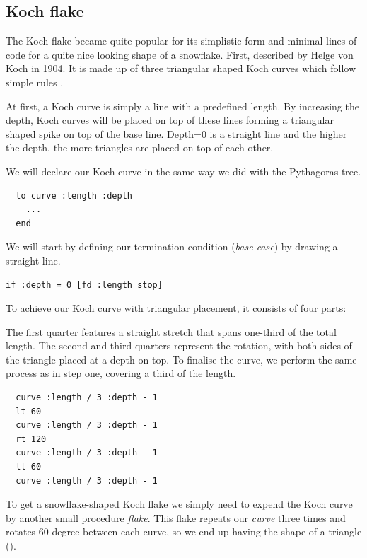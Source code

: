 \documentclass[a4paper, 11pt]{article}
\begin{document}
\subsection{Koch flake}

The Koch flake became quite popular for its simplistic form and minimal lines of code for a quite nice looking shape of a snowflake.
First, described by Helge von Koch in 1904. It is made up of three triangular shaped Koch curves which follow simple rules \cite{mathworld2}.

At first, a Koch curve is simply a line with a predefined length. By increasing the depth, Koch curves will be placed on top of these lines forming a triangular shaped spike on top of the base line.
Depth=0 is a straight line and the higher the depth, the more triangles are placed on top of each other.

We will declare our Koch curve in the same way we did with the Pythagoras tree.

\begin{lstlisting}
  to curve :length :depth
    ...
  end
\end{lstlisting}

We will start by defining our termination condition (\textit{base case}) by drawing a straight line.

\begin{lstlisting}[title=Part 1/4:]
  if :depth = 0 [fd :length stop]
\end{lstlisting}

To achieve our Koch curve with triangular placement, it consists of four parts:

The first quarter features a straight stretch that spans one-third of the total length. The second and third quarters represent the rotation, with both sides of the triangle placed at a depth on top. To finalise the curve, we perform the same process as in step one, covering a third of the length.

\begin{lstlisting}
  curve :length / 3 :depth - 1
  lt 60
  curve :length / 3 :depth - 1
  rt 120
  curve :length / 3 :depth - 1
  lt 60
  curve :length / 3 :depth - 1
\end{lstlisting}

To get a snowflake-shaped Koch flake we simply need to expend the Koch curve by another small procedure \textit{flake}.
This flake repeats our \textit{curve} three times and rotates 60 degree between each curve, so we end up having the shape of a triangle ().
\end{document}
